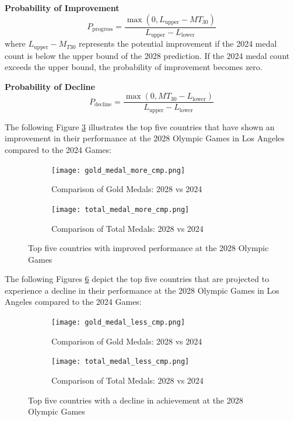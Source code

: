 \documentclass{mcmthesis}
\begin{document}
\textbf{Probability of Improvement}
\[
P_{\text{progress}} = \frac{\max(0, L_{\text{upper}} - MT_{30})}{L_{\text{upper}} - L_{\text{lower}}}
\]
where \( L_{\text{upper}} - M_{T30} \) represents the potential improvement if the 2024 medal count is below the upper bound of the 2028 prediction. If the 2024 medal count exceeds the upper bound, the probability of improvement becomes zero.

\textbf{Probability of Decline} 
\[
P_{\text{decline}} = \frac{\max(0, MT_{30} - L_{\text{lower}})}{L_{\text{upper}} - L_{\text{lower}}}
\]

The following Figure \ref{fig:medal_comparison} illustrates the top five countries that have shown an improvement in their performance at the 2028 Olympic Games in Los Angeles compared to the 2024 Games:


\begin{figure}[h!]
	\centering
	\begin{subfigure}[b]{0.45\textwidth}
		\texttt{[image: gold\_medal\_more\_cmp.png]}
		\caption{Comparison of Gold Medals: 2028 vs 2024}
		\label{fig:gold_medal}
	\end{subfigure}
	\hfill
	\begin{subfigure}[b]{0.45\textwidth}
		\texttt{[image: total\_medal\_more\_cmp.png]}
		\caption{Comparison of Total Medals: 2028 vs 2024}
		\label{fig:total_medal}
	\end{subfigure}
	\caption{Top five countries with improved performance at the 2028 Olympic Games}
	\label{fig:medal_comparison}
\end{figure}

The following Figures \ref{fig:medal_comparison1} depict the top five countries that are projected to experience a decline in their performance at the 2028 Olympic Games in Los Angeles compared to the 2024 Games:

\begin{figure}[h!]
	\centering
	\begin{subfigure}[b]{0.45\textwidth}
		\texttt{[image: gold\_medal\_less\_cmp.png]}
		\caption{Comparison of Gold Medals: 2028 vs 2024}
		\label{fig:gold_medal1}
	\end{subfigure}
	\hfill
	\begin{subfigure}[b]{0.45\textwidth}
		\texttt{[image: total\_medal\_less\_cmp.png]}
		\caption{Comparison of Total Medals: 2028 vs 2024}
		\label{fig:total_medal1}
	\end{subfigure}
	\caption{Top five countries with a decline in achievement at the 2028 Olympic Games}
	\label{fig:medal_comparison1}
\end{figure}
\end{document}
